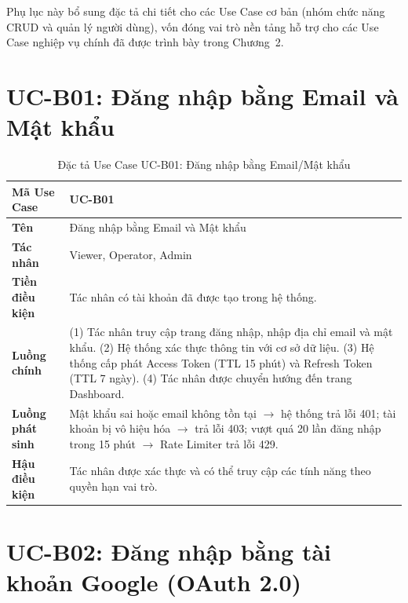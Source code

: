 \documentclass[../DoAn.tex]{subfiles}
\begin{document}
Phụ lục này bổ sung đặc tả chi tiết cho các Use Case cơ bản (nhóm chức năng CRUD và quản lý người dùng), vốn đóng vai trò nền tảng hỗ trợ cho các Use Case nghiệp vụ chính đã được trình bày trong Chương~2.

\section{UC-B01: Đăng nhập bằng Email và Mật khẩu}

\begin{longtable}{|p{3.5cm}|p{10.0cm}|}
\caption{Đặc tả Use Case UC-B01: Đăng nhập bằng Email/Mật khẩu}\label{tab:ucb01}\\
\hline
\textbf{Mã Use Case} & UC-B01 \\
\hline
\textbf{Tên} & Đăng nhập bằng Email và Mật khẩu \\
\hline
\textbf{Tác nhân} & Viewer, Operator, Admin \\
\hline
\textbf{Tiền điều kiện} & Tác nhân có tài khoản đã được tạo trong hệ thống. \\
\hline
\textbf{Luồng chính} &
(1) Tác nhân truy cập trang đăng nhập, nhập địa chỉ email và mật khẩu. \newline
(2) Hệ thống xác thực thông tin với cơ sở dữ liệu. \newline
(3) Hệ thống cấp phát Access Token (TTL 15 phút) và Refresh Token (TTL 7 ngày). \newline
(4) Tác nhân được chuyển hướng đến trang Dashboard. \\
\hline
\textbf{Luồng phát sinh} & Mật khẩu sai hoặc email không tồn tại $\to$ hệ thống trả lỗi 401; tài khoản bị vô hiệu hóa $\to$ trả lỗi 403; vượt quá 20 lần đăng nhập trong 15 phút $\to$ Rate Limiter trả lỗi 429. \\
\hline
\textbf{Hậu điều kiện} & Tác nhân được xác thực và có thể truy cập các tính năng theo quyền hạn vai trò. \\
\hline
\end{longtable}

\section{UC-B02: Đăng nhập bằng tài khoản Google (OAuth 2.0)}
\end{document}
